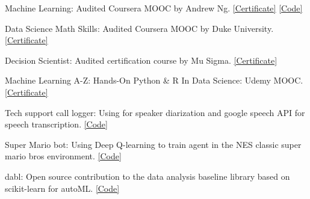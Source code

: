 \documentclass[10pt,a4paper]{article}
\begin{document}
\spacedhrule{1.6em}{-0.4em}



\inlineheadsection
  {Machine Learning:}
  {Audited Coursera MOOC by Andrew Ng. \href{https://www.coursera.org/account/accomplishments/certificate/6UDGCV3A6A7L?utm_medium=certificate&utm_source=link&utm_campaign=copybutton_certificate}{[Certificate]}
\href{https://github.com/praths007/coursera_machine_learning}{[Code]}}

\vspace{0.5em}

\inlineheadsection
{Data Science Math Skills:}
{Audited Coursera MOOC by Duke University. \href{https://www.coursera.org/account/accomplishments/certificate/S3BXH5HH2BLH}{[Certificate]}
}

\vspace{0.5em}


\inlineheadsection
  {Decision Scientist:}
  {Audited certification course by Mu Sigma. \href{https://www.portal.mu-sigma.com/msu/DecisionScientistCertificate/8388-Jun2017-10390.html}{[Certificate]}}

\vspace{0.5em}

\inlineheadsection
  {Machine Learning A-Z: Hands-On Python \& R In Data Science:}
  {Udemy MOOC. \href{https://www.udemy.com/certificate/UC-PXVDG31R/}{[Certificate]}}

\spacedhrule{1.6em}{-0.4em}



\inlineheadsection
  {Tech support call logger:}
  {Using  for speaker diarization and google speech API for speech transcription. \href{https://github.com/praths007/speechtotext/}{[Code]}}

\vspace{0.5em}

\inlineheadsection
  {Super Mario bot:}
  {Using Deep Q-learning to train agent in the NES classic super mario bros environment. \href{https://github.com/praths007/rl_super_mario}{[Code]}}
  
\vspace{0.5em}
  
 \inlineheadsection
 {dabl:}
 {Open source contribution to the data analysis baseline library based on scikit-learn for autoML. \href{https://github.com/dabl/dabl}{[Code]}}
 
 \vspace{0.5em}
\end{document}
